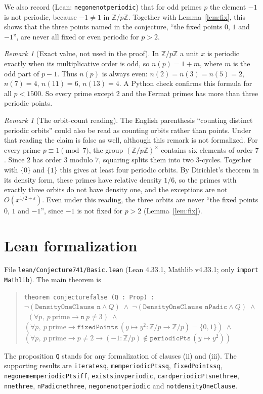 \documentclass[11pt]{article}
\theoremstyle{definition}
\theoremstyle{remark}
\newtheorem{remark}[theorem]{Remark}
\renewcommand{\_}{\oldus\allowbreak}
\begin{document}
We also record (Lean: \texttt{neg\_one\_not\_periodic}) that for odd primes $p$ the element $-1$ is not
periodic, because $-1 \ne 1$ in $\mathbb{Z}/p\mathbb{Z}$. Together with Lemma~\ref{lem:fix}, this shows that
the three points named in the conjecture, ``the fixed points $0$, $1$ and $-1$'', are never all fixed or
even periodic for $p > 2$.

\begin{remark}[Exact value, not used in the proof]
In $\mathbb{Z}/p\mathbb{Z}$ a unit $x$ is periodic exactly when its multiplicative order is odd, so
$n(p) = 1 + m$, where $m$ is the odd part of $p-1$. Thus $n(p)$ is always even:
$n(2)=n(3)=n(5)=2$, $n(7)=4$, $n(11)=6$, $n(13)=4$. A Python check confirms this formula for all
$p < 1500$. So every prime except $2$ and the Fermat primes has more than three periodic points.
\end{remark}

\begin{remark}[The orbit-count reading]
The English parenthesis ``counting distinct periodic orbits'' could also be read as counting orbits rather
than points. Under that reading the claim is false as well, although this remark is not formalized. For
every prime $p \equiv 1 \pmod 7$, the group $(\mathbb{Z}/p\mathbb{Z})^\times$ contains six elements of
order $7$. Since $2$ has order $3$ modulo $7$, squaring splits them into two $3$-cycles. Together with
$\{0\}$ and $\{1\}$ this gives at least four periodic orbits. By Dirichlet's theorem in its density form,
these primes have relative density $1/6$, so the primes with exactly three orbits do not have density one,
and the exceptions are not $O(x^{1/2+\varepsilon})$. Even under this reading, the three orbits are never
``the fixed points $0$, $1$ and $-1$'', since $-1$ is not fixed for $p>2$ (Lemma~\ref{lem:fix}).
\end{remark}

\section{Lean formalization}

File \texttt{lean/Conjecture741/Basic.lean} (Lean 4.33.1, Mathlib v4.33.1; only \texttt{import Mathlib}).
The main theorem is
\begin{quote}
\texttt{theorem conjecture\_00000000741\_false (Q : Prop) :}\
\quad $\neg(\texttt{DensityOneClause n} \wedge Q) \;\wedge\; \neg(\texttt{DensityOneClause nPadic} \wedge Q)
\;\wedge$\
\quad $(\forall p,\ p\ \text{prime} \to \texttt{n}\ p \ne 3) \;\wedge$\
\quad $(\forall p,\ p\ \text{prime} \to \texttt{fixedPoints}\,(y \mapsto y^2 : \mathbb{Z}/p \to \mathbb{Z}/p)
= \{0,1\}) \;\wedge$\
\quad $(\forall p,\ p\ \text{prime} \to p \ne 2 \to (-1 : \mathbb{Z}/p) \notin
\texttt{periodicPts}\,(y \mapsto y^2))$
\end{quote}
The proposition \texttt{Q} stands for any formalization of clauses (ii) and (iii). The supporting
results are \texttt{iterate\_sq}, \texttt{mem\_periodicPts\_sq}, \texttt{fixedPoints\_sq},
\texttt{neg\_one\_mem\_periodicPts\_iff}, \texttt{exists\_inv\_periodic},
\texttt{card\_periodicPts\_ne\_three}, \texttt{n\_ne\_three}, \texttt{nPadic\_ne\_three},
\texttt{neg\_one\_not\_periodic} and \texttt{not\_densityOneClause}.
\end{document}

